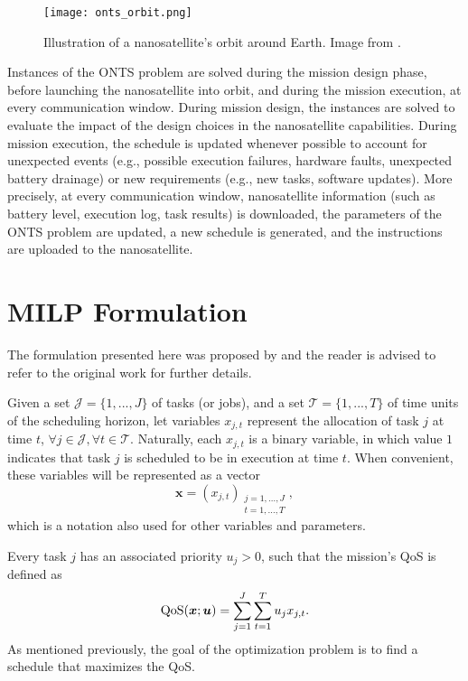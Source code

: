 \begin{figure}[h]
    \centering
    \texttt{[image: onts\_orbit.png]}
    \caption{Illustration of a nanosatellite's orbit around Earth. Image from .}
    \label{fig:onts-orbit}
\end{figure}

Instances of the ONTS problem are solved during the mission design phase, before launching the nanosatellite into orbit, and during the mission execution, at every communication window. 
During mission design, the instances are solved to evaluate the impact of the design choices in the nanosatellite capabilities.
During mission execution, the schedule is updated whenever possible to account for unexpected events (e.g., possible execution failures, hardware faults, unexpected battery drainage) or new requirements (e.g., new tasks, software updates).
More precisely, at every communication window, nanosatellite information (such as battery level, execution log, task results) is downloaded, the parameters of the ONTS problem are updated, a new schedule is generated, and the instructions are uploaded to the nanosatellite.


\section{MILP Formulation}\label{sec:onts-milp-formulation}

The formulation presented here was proposed by  and the reader is advised to refer to the original work for further details.

Given a set $\mathcal{J}=\{1,...,J\}$ of tasks (or jobs), and a set $\mathcal{T}=\{1,...,T\}$ of time units of the scheduling horizon, let variables $x_{j,t}$ represent the allocation of task $j$ at time $t$, $\forall j\in \mathcal{J}, \forall t\in \mathcal{T}$.
Naturally, each $x_{j,t}$ is a binary variable, in which value $1$ indicates that task $j$ is scheduled to be in execution at time $t$.
When convenient, these variables will be represented as a vector \[
    \bm{x} = \left( x_{j,t} \right)_{\substack{j=1,\ldots,J\\ t=1,\ldots,T}}
,\] which is a notation also used for other variables and parameters.

Every task $j$ has an associated priority $u_j > 0$, such that the mission's QoS is defined as
\begin{equation}\label{eq:qos}
    {\rm QoS}(\bm{x};\bm{u}) = \sum_{j=1}^{J} \sum_{t=1}^{T} {u}_{j} x_{j,t}
.\end{equation}
As mentioned previously, the goal of the optimization problem is to find a schedule that maximizes the QoS.

